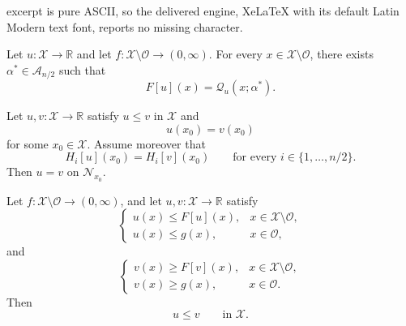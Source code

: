 \documentclass[10pt,a4paper]{amsart}
\begin{document}
excerpt is pure ASCII, so the delivered engine, XeLaTeX with its default Latin Modern text font, reports no missing character.
\begin{lemma}\label{lemma:restrict-set-alpha-2}
Let $u\colon \mathcal{X} \to \mathbb{R}$ and let $f\colon \mathcal X\setminus \mathcal O\to (0,\infty)$. For every $x\in\mathcal X\setminus\mathcal O$, there exists $\alpha^*\in\mathcal A_{n/2}$ such that
\[
    F[u](x)=\mathcal Q_u(x;\alpha^*).
\]
\end{lemma}

\begin{proposition}\label{prop:propagation-to-boundary}
Let \(u,v\colon\mathcal X\to \mathbb R\) satisfy \(u\le v\) in \(\mathcal X\) and
\[
    u(x_0)=v(x_0)
\]
for some \(x_0\in \mathcal X\). Assume moreover that
\[
    H_i[u](x_0)=H_i[v](x_0)\qquad \text{for every } i\in\{1,\dots,n/2\}.
\]
Then \(u=v\) on \(\mathcal N_{x_0}\).
\end{proposition}

\begin{theorem}\label{thm:comparison-principle}
Let \(f\colon\mathcal X\setminus\mathcal O
\to(0,\infty)\), and let \(u,v\colon\mathcal X\to\mathbb R\) satisfy
\begin{equation}\label{eq:bvp-sub}
    \begin{cases}
        \displaystyle
        u(x) \leq F[u](x),
        & x\in\mathcal X\setminus\mathcal O,\\[3ex]
        u(x)\leq g(x),
        & x\in\mathcal O,
    \end{cases}
\end{equation}
and
\begin{equation}\label{eq:bvp-super}
    \begin{cases}
        \displaystyle
        v(x) \geq F[v](x),
        & x\in\mathcal X\setminus\mathcal O,\\[3ex]
        v(x)\geq g(x),
        & x\in\mathcal O.
    \end{cases}
\end{equation}
Then
\[
    u\leq v
    \qquad\text{in }\mathcal X.
\]
\end{theorem}
\end{document}
